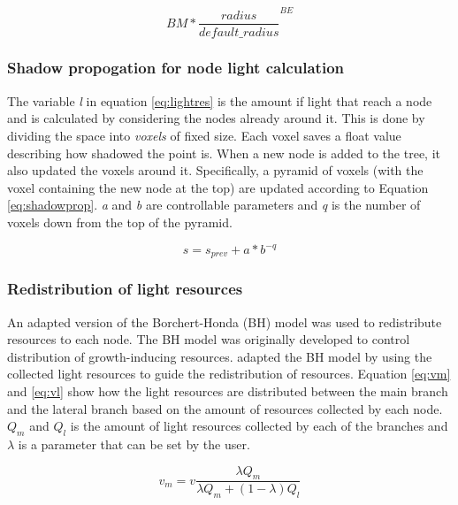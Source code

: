\documentclass{article}
\begin{document}
  				\begin{equation}
  					\label{eq:nodecost}
  					BM * {\frac{radius}{default\_radius}}^{BE}
  				\end{equation}
  				
  			\subsubsection*{Shadow propogation for node light calculation}
  				
  				The variable \textit{l} in equation \ref{eq:lightres} is the amount if light that reach a node and is calculated by considering the nodes already around it. This is done by dividing the space into \textit{voxels} of fixed size. Each voxel saves a float value describing how shadowed the point is. When a new node is added to the tree, it also updated the voxels around it. Specifically, a pyramid of voxels (with the voxel containing the new node at the top) are updated according to Equation \ref{eq:shadowprop}. \textit{a} and \textit{b} are controllable parameters and \textit{q} is the number of voxels down from the top of the pyramid. \citep{palubicki2009self}
  				
  				\begin{equation}
  					\label{eq:shadowprop}
  					s = s_{prev} + a*b^{-q}
  				\end{equation}
  			
  			\subsubsection*{Redistribution of light resources}
  				An adapted version of the Borchert-Honda (BH) model \citep{borchert1984control} was used to redistribute resources to each node. The BH model was originally developed to control distribution of growth-inducing resources. \cite{palubicki2009self} adapted the BH model by using the collected light resources to guide the redistribution of resources. Equation \ref{eq:vm} and \ref{eq:vl} show how the light resources are distributed between the main branch and the lateral branch  based on the amount of resources collected by each node. $Q_m$ and $Q_l$ is the amount of light resources collected by each of the branches and $\lambda$ is a parameter that can be set by the user.
  			
	  			\begin{equation}
	  				\label{eq:vm}
	  				v_m = v\frac{\lambda Q_m}{\lambda Q_m + (1 - \lambda)Q_l}
	  			\end{equation}
	  			
\end{document}
